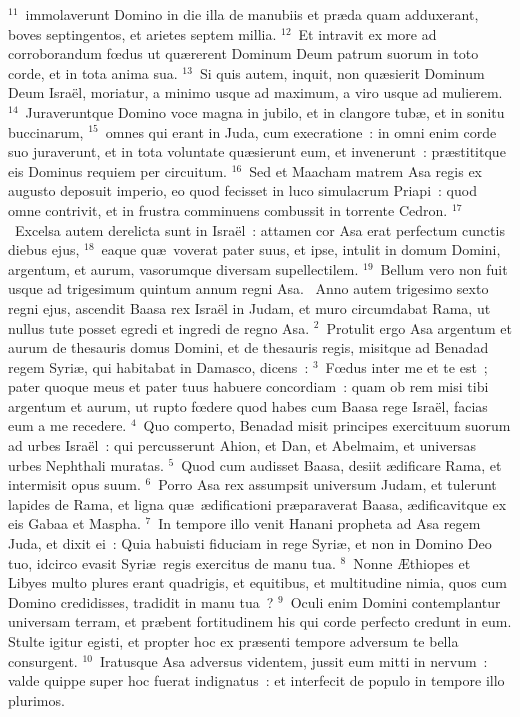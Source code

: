 ${}^{11}$~immolaverunt Domino in die illa de manubiis et pr\ae da quam adduxerant, boves septingentos, et arietes septem millia.
${}^{12}$~Et intravit ex more ad corroborandum fœdus ut qu\ae rerent Dominum Deum patrum suorum in toto corde, et in tota anima sua.
${}^{13}$~Si quis autem, inquit, non qu\ae sierit Dominum Deum Isra\"el, moriatur, a minimo usque ad maximum, a viro usque ad mulierem.
${}^{14}$~Juraveruntque Domino voce magna in jubilo, et in clangore tub\ae , et in sonitu buccinarum,
${}^{15}$~omnes qui erant in Juda, cum execratione~: in omni enim corde suo juraverunt, et in tota voluntate qu\ae sierunt eum, et invenerunt~: pr\ae stititque eis Dominus requiem per circuitum.
${}^{16}$~Sed et Maacham matrem Asa regis ex augusto deposuit imperio, eo quod fecisset in luco simulacrum Priapi~: quod omne contrivit, et in frustra comminuens combussit in torrente Cedron.
${}^{17}$~Excelsa autem derelicta sunt in Isra\"el~: attamen cor Asa erat perfectum cunctis diebus ejus,
${}^{18}$~eaque qu\ae\ voverat pater suus, et ipse, intulit in domum Domini, argentum, et aurum, vasorumque diversam supellectilem.
${}^{19}$~Bellum vero non fuit usque ad trigesimum quintum annum regni Asa.
~Anno autem trigesimo sexto regni ejus, ascendit Baasa rex Isra\"el in Judam, et muro circumdabat Rama, ut nullus tute posset egredi et ingredi de regno Asa.
${}^{2}$~Protulit ergo Asa argentum et aurum de thesauris domus Domini, et de thesauris regis, misitque ad Benadad regem Syri\ae , qui habitabat in Damasco, dicens~:
${}^{3}$~Fœdus inter me et te est~; pater quoque meus et pater tuus habuere concordiam~: quam ob rem misi tibi argentum et aurum, ut rupto fœdere quod habes cum Baasa rege Isra\"el, facias eum a me recedere.
${}^{4}$~Quo comperto, Benadad misit principes exercituum suorum ad urbes Isra\"el~: qui percusserunt Ahion, et Dan, et Abelmaim, et universas urbes Nephthali muratas.
${}^{5}$~Quod cum audisset Baasa, desiit \ae dificare Rama, et intermisit opus suum.
${}^{6}$~Porro Asa rex assumpsit universum Judam, et tulerunt lapides de Rama, et ligna qu\ae\ \ae dificationi pr\ae paraverat Baasa, \ae dificavitque ex eis Gabaa et Maspha.
${}^{7}$~In tempore illo venit Hanani propheta ad Asa regem Juda, et dixit ei~: Quia habuisti fiduciam in rege Syri\ae , et non in Domino Deo tuo, idcirco evasit Syri\ae\ regis exercitus de manu tua.
${}^{8}$~Nonne \AE thiopes et Libyes multo plures erant quadrigis, et equitibus, et multitudine nimia, quos cum Domino credidisses, tradidit in manu tua~?
${}^{9}$~Oculi enim Domini contemplantur universam terram, et pr\ae bent fortitudinem his qui corde perfecto credunt in eum. Stulte igitur egisti, et propter hoc ex pr\ae senti tempore adversum te bella consurgent.
${}^{10}$~Iratusque Asa adversus videntem, jussit eum mitti in nervum~: valde quippe super hoc fuerat indignatus~: et interfecit de populo in tempore illo plurimos.


